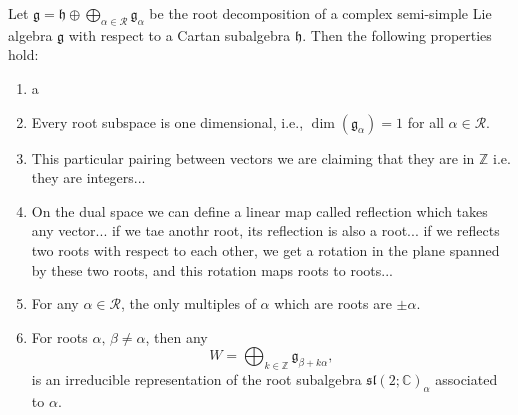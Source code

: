 \begin{theorem}
    Let \(\mathfrak{g} = \mathfrak{h} \oplus \bigoplus_{\alpha \in \mathcal{R}} \mathfrak{g}_\alpha \) be the root decomposition of a complex semi-simple Lie algebra \(\mathfrak{g}\) with respect to a Cartan subalgebra \(\mathfrak{h}\). Then the following properties hold:
    \begin{enumerate}[label=(\roman*)]
        \item a
        \item Every root subspace is one dimensional, i.e., \(\dim(\mathfrak{g}_\alpha) = 1\) for all \(\alpha \in \mathcal{R}\).
        \item This particular pairing between vectors we are claiming that they are in \(\mathbb{Z}\) i.e. they are integers...
        \item On the dual space we can define a linear map called reflection which takes any vector... if we tae anothr root, its reflection is also a root... if we reflects two roots with respect to each other, we get a rotation in the plane spanned by these two roots, and this rotation maps roots to roots...
        \item For any \(\alpha \in \mathcal{R}\), the only multiples of \(\alpha\) which are roots are \(\pm \alpha\).
        \item For roots \(\alpha,\,\beta\neq\alpha\), then any
              \[
                  W = \bigoplus_{k \in \mathbb{Z}} \mathfrak{g}_{\beta + k \alpha},
              \]
              is an irreducible representation of the root subalgebra \(\mathfrak{sl}(2; \mathbb{C})_{\alpha}\) associated to \(\alpha\).
    \end{enumerate}
\end{theorem}
